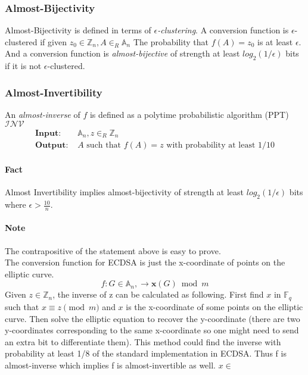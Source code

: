\documentclass[18]{article}
\begin{document}
\subsubsection{Almost-Bijectivity}
Almost-Bijectivity is defined in terms of \textit{$\epsilon$-clustering}.
A conversion function is $\epsilon$-clustered if given
$z_0 \in \mathbb{Z}_n, A \in _R \mathbb{A}_n$
The probability that
$f(A)=z_0$ is at least $\epsilon$. And a conversion function is \textit{almost-bijective} of strength at least $log_2(1/\epsilon)$ bits if  it is not $\epsilon$-clustered.
\subsubsection{Almost-Invertibility}
An \textit{almost-inverse} of $f$ is defined as a polytime probabilistic
algorithm (PPT) $\mathcal{INV}$
\begin{align*}
\textbf{Input: } &\mathbb{A}_n, z \in _R \mathbb{Z}_n \\
\textbf{Output: } &A \text{ such that } f(A)=z
\text{ with probability at least } 1/10
\end{align*}
\paragraph{Fact} Almost Invertibility implies almost-bijectivity of strength at least
$log_2(1/\epsilon)$ bits where $\epsilon > \frac{10}{n}$.
\paragraph{Note} The contrapositive of the statement above is easy to prove.
\\
The conversion function for ECDSA is just the x-coordinate of points on the elliptic curve.
\begin{equation*}
f: G \in \mathbb{A}_n, \to \mathbf{x}(G) \bmod m
\end{equation*}
Given $z \in \mathbb{Z}_n$, the inverse of z can be calculated as following.
First find $x$ in $\mathbb{F}_q$ such that $x \equiv z \pmod{m}$ and $x$ is the x-coordinate of some points on the elliptic curve. Then solve the elliptic equation to recover the y-coordinate (there are two y-coordinates corresponding to the same x-coordinate so one might need to send an extra bit to differentiate them).
This method could find the inverse with probability at least 1/8 of the standard implementation in ECDSA. Thus f is almost-inverse which implies f is almost-invertible as well.
$x \in $
\end{document}
